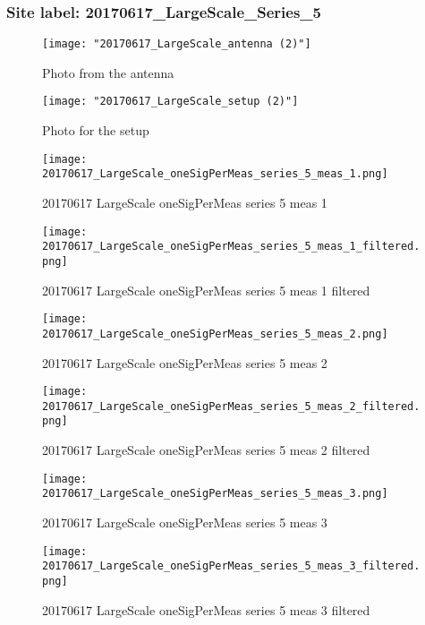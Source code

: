 \subsubsection{Site label: 20170617\_LargeScale\_Series\_5}
\begin{figure}[ht] \caption{Photo from the antenna}
\texttt{[image: "20170617\_LargeScale\_antenna (2)"]}\centering\end{figure}
\begin{figure}[ht] \caption{Photo for the setup}
\texttt{[image: "20170617\_LargeScale\_setup (2)"]}\centering\end{figure}
\begin{figure}[ht] \caption{20170617 LargeScale oneSigPerMeas series 5 meas 1}
\texttt{[image: 20170617\_LargeScale\_oneSigPerMeas\_series\_5\_meas\_1.png]}\centering\end{figure}
\begin{figure}[ht] \caption{20170617 LargeScale oneSigPerMeas series 5 meas 1 filtered}
\texttt{[image: 20170617\_LargeScale\_oneSigPerMeas\_series\_5\_meas\_1\_filtered.png]}\centering\end{figure}
\begin{figure}[ht] \caption{20170617 LargeScale oneSigPerMeas series 5 meas 2}
\texttt{[image: 20170617\_LargeScale\_oneSigPerMeas\_series\_5\_meas\_2.png]}\centering\end{figure}
\begin{figure}[ht] \caption{20170617 LargeScale oneSigPerMeas series 5 meas 2 filtered}
\texttt{[image: 20170617\_LargeScale\_oneSigPerMeas\_series\_5\_meas\_2\_filtered.png]}\centering\end{figure}
\begin{figure}[ht] \caption{20170617 LargeScale oneSigPerMeas series 5 meas 3}
\texttt{[image: 20170617\_LargeScale\_oneSigPerMeas\_series\_5\_meas\_3.png]}\centering\end{figure}
\begin{figure}[ht] \caption{20170617 LargeScale oneSigPerMeas series 5 meas 3 filtered}
\texttt{[image: 20170617\_LargeScale\_oneSigPerMeas\_series\_5\_meas\_3\_filtered.png]}\centering\end{figure}
\clearpage
